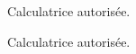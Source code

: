 
\vfill



\begin{multicols}{2}
    \begin{center}
        Calculatrice autorisée.
    \end{center}


\columnbreak


    \begin{center}
        Calculatrice autorisée.
    \end{center}

\vfill

\end{multicols}
